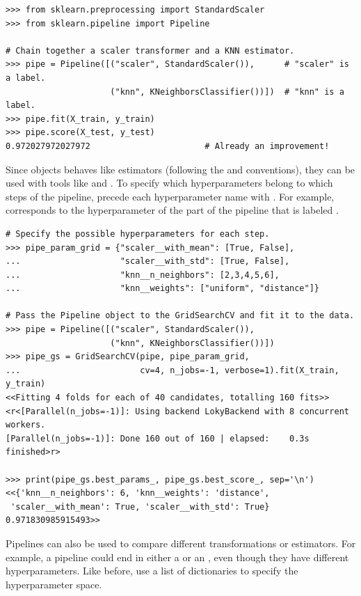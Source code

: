 \begin{lstlisting}
>>> from sklearn.preprocessing import StandardScaler
>>> from sklearn.pipeline import Pipeline

# Chain together a scaler transformer and a KNN estimator.
>>> pipe = Pipeline([("scaler", StandardScaler()),      # "scaler" is a label.
                     ("knn", KNeighborsClassifier())])  # "knn" is a label.
>>> pipe.fit(X_train, y_train)
>>> pipe.score(X_test, y_test)
0.972027972027972                       # Already an improvement!
\end{lstlisting}

Since  objects behaves like estimators (following the  and  conventions), they can be used with tools like  and .
To specify which hyperparameters belong to which steps of the pipeline, precede each hyperparameter name with .
For example,  corresponds to the  hyperparameter of the part of the pipeline that is labeled .

\begin{lstlisting}
# Specify the possible hyperparameters for each step.
>>> pipe_param_grid = {"scaler__with_mean": [True, False],
...                    "scaler__with_std": [True, False],
...                    "knn__n_neighbors": [2,3,4,5,6],
...                    "knn__weights": ["uniform", "distance"]}

# Pass the Pipeline object to the GridSearchCV and fit it to the data.
>>> pipe = Pipeline([("scaler", StandardScaler()),
                     ("knn", KNeighborsClassifier())])
>>> pipe_gs = GridSearchCV(pipe, pipe_param_grid,
...                        cv=4, n_jobs=-1, verbose=1).fit(X_train, y_train)
<<Fitting 4 folds for each of 40 candidates, totalling 160 fits>>
<r<[Parallel(n_jobs=-1)]: Using backend LokyBackend with 8 concurrent workers.
[Parallel(n_jobs=-1)]: Done 160 out of 160 | elapsed:    0.3s finished>r>

>>> print(pipe_gs.best_params_, pipe_gs.best_score_, sep='\n')
<<{'knn__n_neighbors': 6, 'knn__weights': 'distance',
 'scaler__with_mean': True, 'scaler__with_std': True}
0.971830985915493>>
\end{lstlisting}

Pipelines can also be used to compare different transformations or estimators.
For example, a pipeline could end in either a  or an , even though they have different hyperparameters.
Like before, use a list of dictionaries to specify the hyperparameter space.

